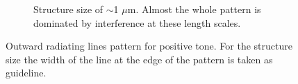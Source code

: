 \begin{figure}[!t]
\begin{subfigure}[t]{0.32\linewidth}
  	\label{fig:b2d2_q2}
  \end{subfigure}
 \hfill
     \begin{subfigure}[t]{0.32\linewidth}
  	\centering
  	\caption{Structure size of $\sim$1 $\mu$m. Almost the whole pattern is dominated by interference at these length scales.}
  	\label{fig:b2d3_q3}
  \end{subfigure}
\caption{Outward radiating lines pattern for positive tone. For the structure size the width of the line at the edge of the pattern is taken as guideline.}
 \end{figure}

